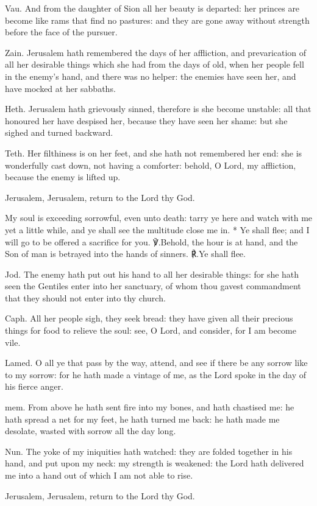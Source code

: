 \documentclass[12pt]{book}
\begin{document}
\begin{enpars}
Vau. And from the daughter of Sion all her beauty is departed: her princes are become like rams that find no pastures: and they are gone away without strength before the face of the pursuer.

Zain. Jerusalem hath remembered the days of her affliction, and prevarication of all her desirable things which she had from the days of old, when her people fell in the enemy's hand, and there was no helper: the enemies have seen her, and have mocked at her sabbaths.

Heth. Jerusalem hath grievously sinned, therefore is she become unstable: all that honoured her have despised her, because they have seen her shame: but she sighed and turned backward.

Teth. Her filthiness is on her feet, and she hath not remembered her end: she is wonderfully cast down, not having a comforter: behold, O Lord, my affliction, because the enemy is lifted up.

Jerusalem, Jerusalem, return to the Lord thy God.
\end{enpars}

\begin{enpars}
My soul is exceeding sorrowful, even unto death: tarry ye here and watch with me yet a little while, and ye shall see the multitude close me in. * Ye shall flee; and I will go to be offered a sacrifice for you.
℣.\@ Behold, the hour is at hand, and the Son of man is betrayed into the hands of sinners.
℟.\@ Ye shall flee.
\end{enpars}

\begin{enpars}
Jod. The enemy hath put out his hand to all her desirable things: for she hath seen the Gentiles enter into her sanctuary, of whom thou gavest commandment that they should not enter into thy church.

Caph. All her people sigh, they seek bread: they have given all their precious things for food to relieve the soul: see, O Lord, and consider, for I am become vile.

Lamed. O all ye that pass by the way, attend, and see if there be any sorrow like to my sorrow: for he hath made a vintage of me, as the Lord spoke in the day of his fierce anger.

mem. From above he hath sent fire into my bones, and hath chastised me: he hath spread a net for my feet, he hath turned me back: he hath made me desolate, wasted with sorrow all the day long.

Nun. The yoke of my iniquities hath watched: they are folded together in his hand, and put upon my neck: my strength is weakened: the Lord hath delivered me into a hand out of which I am not able to rise.

Jerusalem, Jerusalem, return to the Lord thy God.
\end{enpars}
\end{document}
